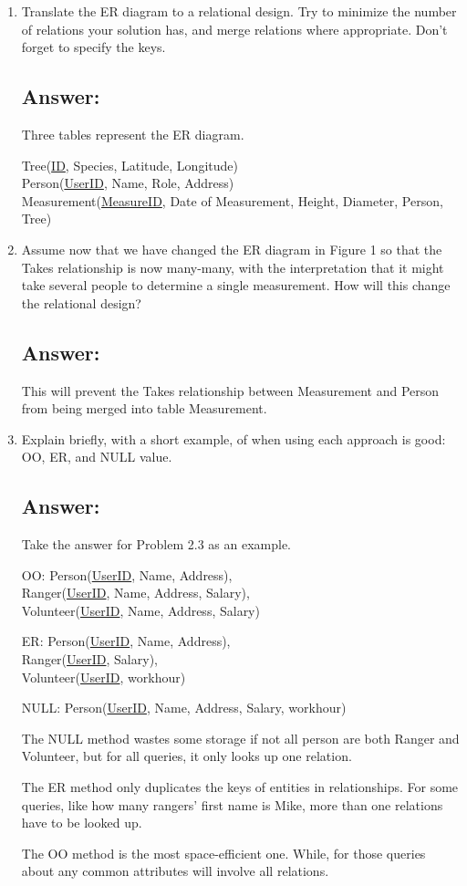 \documentclass[letter,11pt]{article}
\begin{document}
\begin{enumerate}
\item Translate the ER diagram to a relational design. Try to minimize the number of relations your solution has, and merge relations where appropriate. Don’t forget to specify the keys.
\subsection*{Answer:}

Three tables represent the ER diagram. 

Tree(\uline{ID}, Species, Latitude, Longitude)\\
Person(\uline{UserID}, Name, Role, Address)\\
Measurement(\uline{MeasureID}, Date of Measurement, Height, Diameter, Person, Tree)

\item  Assume now that we have changed the ER diagram in Figure 1 so that the Takes relationship is now many-many, with the interpretation that it might take several people to determine a single measurement. How will this change the relational design?
\subsection*{Answer:}
This will prevent the Takes relationship between Measurement and Person from being merged into table Measurement.

\item Explain briefly, with a short example, of when using each approach is good: OO, ER, and NULL value.
\subsection*{Answer:}
Take the answer for Problem 2.3 as an example. 

OO: Person(\uline{UserID}, Name, Address),\\
Ranger(\uline{UserID}, Name, Address, Salary),\\
Volunteer(\uline{UserID}, Name, Address, Salary)

ER: Person(\uline{UserID}, Name, Address),\\
Ranger(\uline{UserID}, Salary),\\
Volunteer(\uline{UserID}, workhour)

NULL: Person(\uline{UserID}, Name, Address, Salary, workhour)

The NULL method wastes some storage if not all person are both Ranger and Volunteer, but for all queries, it only looks up one relation.

The ER method only duplicates the keys of entities in relationships. For some queries, like how many rangers' first name is Mike, more than one relations have to be looked up. 

The OO method is the most space-efficient one. While, for those queries about any common attributes will involve all relations.


\end{enumerate}
\end{document}
